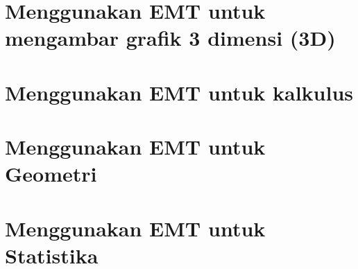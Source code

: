 \documentclass{report}
\begin{document}
\newpage
\chapter{Menggunakan EMT untuk mengambar grafik 3 dimensi (3D)}


\newpage
\chapter{Menggunakan EMT untuk kalkulus}


\newpage
\chapter{Menggunakan EMT untuk Geometri}


\newpage
\chapter{Menggunakan EMT untuk Statistika}

\end{document}
